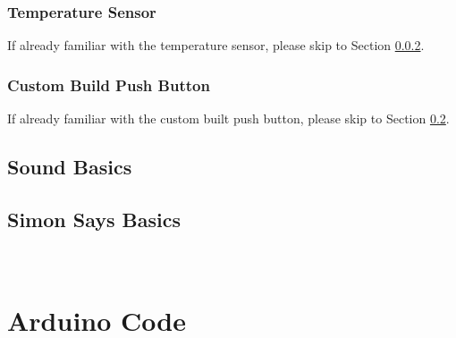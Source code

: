 \documentclass[12pt,letterpaper,oneside]{article}
\begin{document}
			\subsubsection{Temperature Sensor} \label{sec:temp}
			If already familiar with the temperature sensor, please skip to Section \ref{sec:push}. 
			
			\subsubsection{Custom Build Push Button} \label{sec:push}
			If already familiar with the custom built push button, please skip to Section \ref{sec:simon}. 
								
		\subsection{Sound Basics} \label{sec:sound}
		
		\subsection{Simon Says Basics} \label{sec:simon}

\newpage
\appendix
\section{\\Arduino Code} \label{App:AppendixA}

	
\newpage		
\printbibliography
\end{document}
